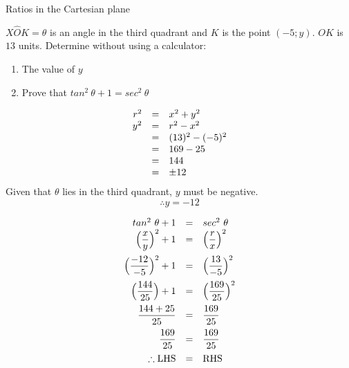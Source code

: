 \begin{wex}{Ratios in the Cartesian plane}{
$X\hat{O}K = \theta$ is an angle in the third quadrant and $K$ is the point $(-5;y)$. $OK$ is $13$ units. Determine without using a calculator:
  \begin{enumerate}[noitemsep, label=\textbf{\arabic*}. ] 
   \item The value of $y$
\item Prove that $tan^{2}~\theta + 1 = sec^{2}~\theta$
  \end{enumerate}
}

{
\begin{equation*}
 \begin{array}{ccl}
    \hfill r^{2} &= & x^{2} + y^{2} \hfill \\
\hfill y^{2} &=& r^{2} - x^{2}\hfill \\
\hfill  &=& (13)^{2} - (-5)^{2} \hfill \\
\hfill  &=& 169-25 \hfill \\
\hfill  &=& 144 \hfill \\
\hfill  &=& \pm 12\hfill 

\end{array}
\end{equation*}
Given that $\theta$ lies in the third quadrant, $y$ must be negative.\\
\begin{equation*}
 \therefore y = -12
\end{equation*}

\begin{equation*}
\begin{array}{ccl}
 \hfill tan^{2}~\theta + 1 &=& sec^{2}~\theta \hfill \\
\hfill \Big(\dfrac{x}{y}\Big)^{2} + 1 &=& \Big(\dfrac{r}{x}\Big)^{2} \hfill \vspace{5pt} \\
\hfill \Big(\dfrac{-12}{-5}\Big)^{2} + 1 &=& \Big(\dfrac{13}{-5}\Big)^{2} \hfill \vspace{5pt}\\
\hfill \Big (\dfrac{144}{25}\Big) + 1 &=& \Big(\dfrac{169}{25}\Big)^{2} \hfill \vspace{5pt}\\
\hfill \dfrac{144 + 25}{25} &=& \dfrac{169}{25} \hfill \vspace{5pt}\\
\hfill \dfrac{169}{25} &=& \dfrac{169}{25} \hfill \vspace{5pt}\\
\hfill \therefore \mbox{LHS} &=& \mbox{RHS} \hfill

\end{array}
\end{equation*}

}
\end{wex}

